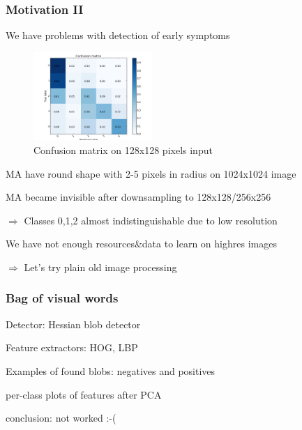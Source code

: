 \begin{frame}\frametitle{Motivation II}
\par We have problems with detection of early symptoms
\par
\begin{figure}
\begin{center}
\vspace{-10pt}
\includegraphics[width=0.4\textwidth]{pics/submission_21_inner_squares_conv5_maxout.png}
\caption{Confusion matrix on 128x128 pixels input}
\vspace{-15pt}
\end{center}
\end{figure}

\par MA have round shape with 2-5 pixels in radius on 1024x1024 image 
\par MA became invisible after downsampling to 128x128/256x256
\par $\Rightarrow$ Classes 0,1,2 almost indistinguishable due to low resolution
\par We have not enough resources\&data to learn on highres images
\par $\Rightarrow$ Let's try plain old image processing

\end{frame}

\begin{frame}\frametitle{Bag of visual words}
\par Detector: Hessian blob detector
\par Feature extractors: HOG, LBP
\par Examples of found blobs: negatives and positives
\par per-class plots of features after PCA
\par conclusion: not worked :-(
\end{frame}

